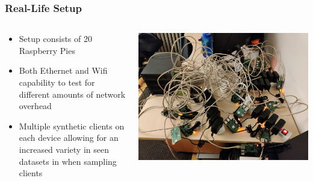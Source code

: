 \documentclass{beamer}
\begin{document}
\begin{frame}
    \frametitle{Real-Life Setup}
    \noindent
    \begin{columns}
	    \begin{column}{.5\textwidth}
		    \begin{itemize}
			    \item Setup consists of 20 Raspberry Pies 
			    \item Both Ethernet and Wifi capability to test for different amounts of network overhead
			    \item Multiple synthetic clients on each device allowing for an increased variety in seen datasets in when sampling clients
		    \end{itemize}    
	    \end{column}
	    \begin{column}{.5\textwidth}
		    \includegraphics[width=1\textwidth]{imgs/IMG_20220322_214443}
	    \end{column}
    \end{columns}
\end{frame}
\end{document}
